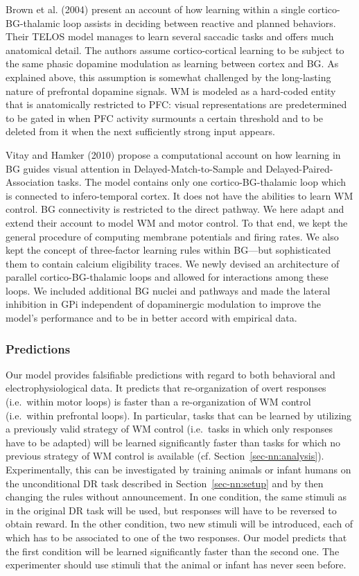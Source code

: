 \documentclass[
  11pt,
  a4paper,
]{scrbook}
\begin{document}
Brown et al. (2004) present an account of how learning within a single
cortico-BG-thalamic loop assists in deciding between reactive and
planned behaviors. Their TELOS model manages to learn several saccadic
tasks and offers much anatomical detail. The authors assume
cortico-cortical learning to be subject to the same phasic dopamine
modulation as learning between cortex and BG. As explained above, this
assumption is somewhat challenged by the long-lasting nature of
prefrontal dopamine signals. WM is modeled as a hard-coded entity that
is anatomically restricted to PFC: visual representations are
predetermined to be gated in when PFC activity surmounts a certain
threshold and to be deleted from it when the next sufficiently strong
input appears.

Vitay and Hamker (2010) propose a computational account on how learning
in BG guides visual attention in Delayed-Match-to-Sample and
Delayed-Paired-Association tasks. The model contains only one
cortico-BG-thalamic loop which is connected to infero-temporal cortex.
It does not have the abilities to learn WM control. BG connectivity is
restricted to the direct pathway. We here adapt and extend their account
to model WM and motor control. To that end, we kept the general
procedure of computing membrane potentials and firing rates. We also
kept the concept of three-factor learning rules within BG---but
sophisticated them to contain calcium eligibility traces. We newly
devised an architecture of parallel cortico-BG-thalamic loops and
allowed for interactions among these loops. We included additional BG
nuclei and pathways and made the lateral inhibition in GPi independent
of dopaminergic modulation to improve the model's performance and to be
in better accord with empirical data.

\subsubsection*{Predictions}\label{predictions}

Our model provides falsifiable predictions with regard to both
behavioral and electrophysiological data. It predicts that
re-organization of overt responses (i.e.~within motor loops) is faster
than a re-organization of WM control (i.e.~within prefrontal loops). In
particular, tasks that can be learned by utilizing a previously valid
strategy of WM control (i.e.~tasks in which only responses have to be
adapted) will be learned significantly faster than tasks for which no
previous strategy of WM control is available (cf.
Section~\ref{sec-nn:analysis}). Experimentally, this can be investigated
by training animals or infant humans on the unconditional DR task
described in Section~\ref{sec-nn:setup} and by then changing the rules
without announcement. In one condition, the same stimuli as in the
original DR task will be used, but responses will have to be reversed to
obtain reward. In the other condition, two new stimuli will be
introduced, each of which has to be associated to one of the two
responses. Our model predicts that the first condition will be learned
significantly faster than the second one. The experimenter should use
stimuli that the animal or infant has never seen before.
\end{document}

